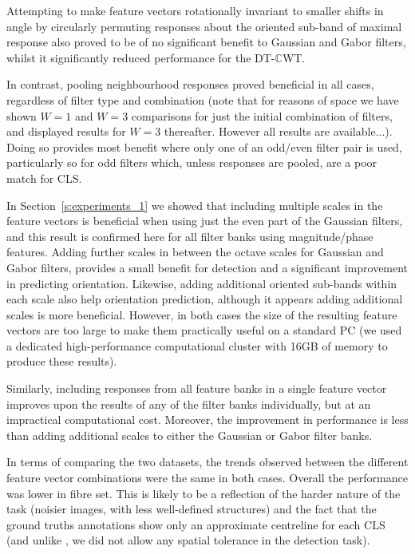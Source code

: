 \documentclass{IEEEtran}
\newcommand{\sref}[1]{Section~\ref{#1}}
\def\dtcwt{DT-$\mathbb{C}$WT}
\begin{document}
Attempting to make feature vectors rotationally invariant to smaller shifts in angle by circularly permuting responses about the oriented sub-band of maximal response also proved to be of no significant benefit to Gaussian and Gabor filters, whilst it significantly reduced performance for the \dtcwt.

In contrast, pooling neighbourhood responses proved beneficial in all cases, regardless of filter type and combination (note that for reasons of space we have shown $W=1$ and $W=3$ comparisons for just the initial combination of filters, and displayed results for $W=3$ thereafter. However all results are available...). Doing so provides most benefit where only one of an odd/even filter pair is used, particularly so for odd filters which, unless responses are pooled, are a poor match for CLS.

In \sref{s:experiments_1} we showed that including multiple scales in the feature vectors is beneficial when using just the even part of the Gaussian filters, and this result is confirmed here for all filter banks using magnitude/phase features. Adding further scales in between the octave scales for Gaussian and Gabor filters, provides a small benefit for detection and a significant improvement in predicting orientation. Likewise, adding additional oriented sub-bands within each scale also help orientation prediction, although it appears adding additional scales is more beneficial. However, in both cases the size of the resulting feature vectors are too large to make them practically useful on a standard PC (we used a dedicated high-performance computational cluster with 16GB of memory to produce these results).

Similarly, including responses from all feature banks in a single feature vector improves upon the results of any of the filter banks individually, but at an impractical computational cost. Moreover, the improvement in performance is less than adding additional scales to either the Gaussian or Gabor filter banks.

In terms of comparing the two datasets, the trends observed between the different feature vector combinations were the same in both cases. Overall the performance was lower in fibre set. This is likely to be a reflection of the harder nature of the task (noisier images, with less well-defined structures) and the fact that the ground truths annotations show only an approximate centreline for each CLS (and unlike \cite{Dabbah}, we did not allow any spatial tolerance in the detection task).
\end{document}
